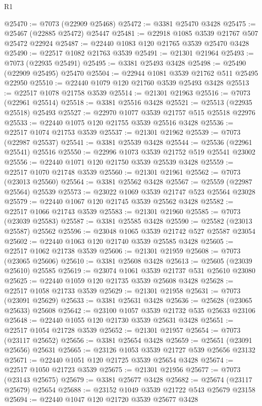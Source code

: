 \begin{lexlean}{R1}
\begin{coremodule}
@25470 := @7073 (@22909 @25468)
@25472 := @3381 @25470 @3428
@25475 := @25467 (@22885 @25472) @25447
@25481 := @22918 @1085 @3539 @21767 @507 @25472 @22924
@25487 := @22440 @1083 @120 @21765 @3539 @25470 @3428
@25490 := @22517 @1082 @21763 @3539
@25491 := @21301 @21964
@25493 := @7073 (@22935 @25491)
@25495 := @3381 @25493 @3428
@25498 := @25490 (@22909 @25495) @25470
@25504 := @22944 @1081 @3539 @21762 @511 @25495 @22950
@25510 := @22440 @1079 @120 @21760 @3539 @25493 @3428
@25513 := @22517 @1078 @21758 @3539
@25514 := @21301 @21963
@25516 := @7073 (@22961 @25514)
@25518 := @3381 @25516 @3428
@25521 := @25513 (@22935 @25518) @25493
@25527 := @22970 @1077 @3539 @21757 @515 @25518 @22976
@25533 := @22440 @1075 @120 @21755 @3539 @25516 @3428
@25536 := @22517 @1074 @21753 @3539
@25537 := @21301 @21962
@25539 := @7073 (@22987 @25537)
@25541 := @3381 @25539 @3428
@25544 := @25536 (@22961 @25541) @25516
@25550 := @22996 @1073 @3539 @21752 @519 @25541 @23002
@25556 := @22440 @1071 @120 @21750 @3539 @25539 @3428
@25559 := @22517 @1070 @21748 @3539
@25560 := @21301 @21961
@25562 := @7073 (@23013 @25560)
@25564 := @3381 @25562 @3428
@25567 := @25559 (@22987 @25564) @25539
@25573 := @23022 @1069 @3539 @21747 @523 @25564 @23028
@25579 := @22440 @1067 @120 @21745 @3539 @25562 @3428
@25582 := @22517 @1066 @21743 @3539
@25583 := @21301 @21960
@25585 := @7073 (@23039 @25583)
@25587 := @3381 @25585 @3428
@25590 := @25582 (@23013 @25587) @25562
@25596 := @23048 @1065 @3539 @21742 @527 @25587 @23054
@25602 := @22440 @1063 @120 @21740 @3539 @25585 @3428
@25605 := @22517 @1062 @21738 @3539
@25606 := @21301 @21959
@25608 := @7073 (@23065 @25606)
@25610 := @3381 @25608 @3428
@25613 := @25605 (@23039 @25610) @25585
@25619 := @23074 @1061 @3539 @21737 @531 @25610 @23080
@25625 := @22440 @1059 @120 @21735 @3539 @25608 @3428
@25628 := @22517 @1058 @21733 @3539
@25629 := @21301 @21958
@25631 := @7073 (@23091 @25629)
@25633 := @3381 @25631 @3428
@25636 := @25628 (@23065 @25633) @25608
@25642 := @23100 @1057 @3539 @21732 @535 @25633 @23106
@25648 := @22440 @1055 @120 @21730 @3539 @25631 @3428
@25651 := @22517 @1054 @21728 @3539
@25652 := @21301 @21957
@25654 := @7073 (@23117 @25652)
@25656 := @3381 @25654 @3428
@25659 := @25651 (@23091 @25656) @25631
@25665 := @23126 @1053 @3539 @21727 @539 @25656 @23132
@25671 := @22440 @1051 @120 @21725 @3539 @25654 @3428
@25674 := @22517 @1050 @21723 @3539
@25675 := @21301 @21956
@25677 := @7073 (@23143 @25675)
@25679 := @3381 @25677 @3428
@25682 := @25674 (@23117 @25679) @25654
@25688 := @23152 @1049 @3539 @21722 @543 @25679 @23158
@25694 := @22440 @1047 @120 @21720 @3539 @25677 @3428

\end{coremodule}
\end{lexlean}
